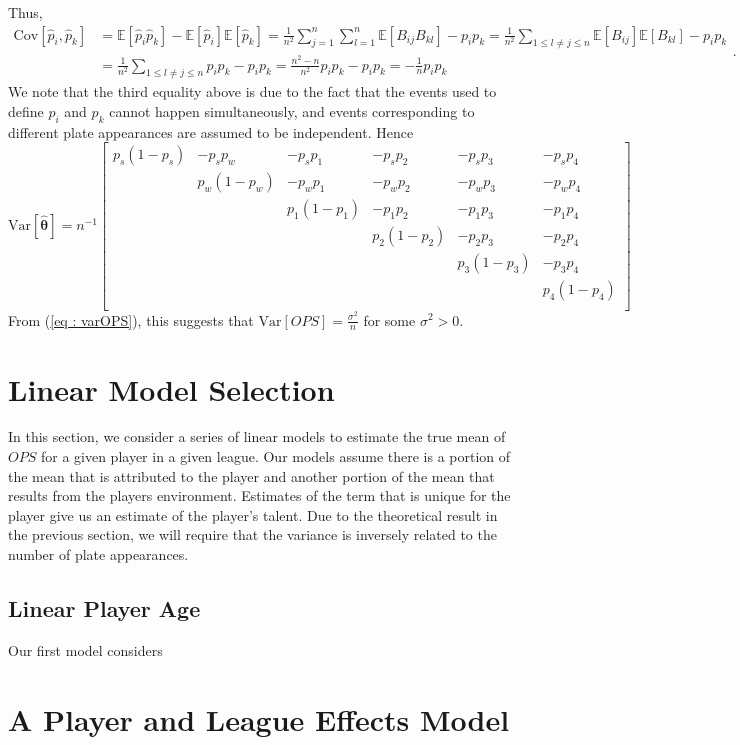 \documentclass [52pt] {article}
\newcommand{\Exp}{\mathbb{E}}
\newcommand{\var}{\text{Var}}
\newcommand{\cov}{\text{Cov}}
\begin{document}
Thus,
\[\begin{split}
\cov[\hat{p}_i,\hat{p}_k] &= \Exp[\hat{p}_i\hat{p}_k]-\Exp[\hat{p}_i]\Exp[\hat{p}_k] = \frac{1}{n^2}\sum_{j=1}^n\sum_{l=1}^n\Exp[B_{ij}B_{kl}] - p_ip_k=\frac{1}{n^2}\sum_{1\le l\not= j\le n} \Exp[B_{ij}]\Exp[B_{kl}]-p_ip_k\\
&=\frac{1}{n^2}\sum_{1\le l\not= j\le n} p_ip_k -p_ip_k=\frac{n^2-n}{n^2} p_ip_k -p_ip_k = -\frac{1}{n}p_i p_k
\end{split}.\]
We note that the third equality above is due to the fact that the events used to define $p_i$ and $p_k$ cannot happen simultaneously, and events corresponding to different plate appearances are assumed to be independent.  Hence 
\[\var[\hat{\pmb{\theta}}] =n^{-1}\begin{bmatrix}
p_s(1-p_s) & -p_sp_w& -p_sp_1 & -p_sp_2 & -p_s p_3& -p_s p_4\\[0.5em]
& p_w(1-p_w)& -p_wp_1 & -p_wp_2& -p_wp_3 & -p_w p_4\\[0.5em]
&& p_1(1-p_1)& -p_1p_2& -p_1p_3& -p_1p_4\\[0.5em]
&&& p_2(1-p_2) & -p_2p_3& -p_2p_4\\[0.5em]
&&&& p_3(1-p_3) & -p_3p_4\\[0.5em]
&&&&&p_4(1-p_4)\\
\end{bmatrix}\]
From (\ref{eq : varOPS}), this suggests that $\var[OPS] =\frac{\sigma^2}{n}$ for some $\sigma^2>0$. \\

\section{Linear Model Selection}
In this section, we consider a series of linear models to estimate the true mean of $OPS$ for a given player in a given league.  Our models assume there is a portion of the mean that is attributed to the player and another portion of the mean that results from the players environment.  Estimates of the term that is unique for the player give us an estimate of the player's talent.  Due to the theoretical result in the previous section, we will require that the variance is inversely related to the number of plate appearances.

\subsection{Linear Player Age}
Our first model considers

\section{A Player and League Effects Model}\label{sec : att2}
\end{document}
